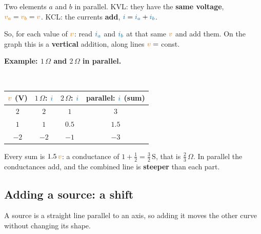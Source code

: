 \documentclass[11pt,a4paper]{article}
\newcommand{\Icol}[1]{\textcolor{ccur}{#1}}
\newcommand{\Vcol}[1]{\textcolor{cvolt}{#1}}
\newcommand{\uni}[1]{\,\mathrm{#1}}
\newcommand{\Sie}{\uni{S}} \newcommand{\Wb}{\uni{Wb}}
\newcommand{\ohm}{\,\Omega}
\newcommand{\minic}[3]{%
  \begin{scope}[shift={(#1-0.55,1.75)}, scale=\miniscale, transform shape]
    \draw (0,#2) node[ocirc] {}; \draw (0,0) node[ocirc] {};
    #3
  \end{scope}}
\newcommand{\mlab}[1]{{\Large #1}}
\newcommand{\miniscale}{0.62}
\newcommand{\mR}[4]{\draw (#1,#2) to[R, l=\mlab{#4}] (#1,#3);}
\newcommand{\mW}[2]{\draw (0,#1) -- (#2,#1); \draw (0,0) -- (#2,0);}                             %
\newcommand{\miniR}[2]{\minic{#1}{2.2}{\mW{2.2}{0.8} \mR{0.8}{2.2}{0}{#2}}}
\newcommand{\miniRpR}[3]{\minic{#1}{2.2}{\mW{2.2}{2.3} \mR{0.8}{2.2}{0}{#2} \mR{2.3}{2.2}{0}{#3}}}
\newcommand{\addRRp}[1]{%
  \path (-0.2,-2.46) rectangle (12.296,3.16);
  \draw[vax] (0,0) -- (2.496,0) node[right=0pt, font=\tiny, text=cvolt] {$v$};
  \draw[vax] (1.248,-1.56) -- (1.248,1.56) node[above=0pt, font=\tiny, text=ccur] {$i$};
  \draw[gray!60] (0.288,-0.05) -- (0.288,0.05); \node[font=\tiny, text=gray, below] at (0.288,-0.03) {$-2$};
  \draw[gray!60] (2.208,-0.05) -- (2.208,0.05); \node[font=\tiny, text=gray, below] at (2.208,-0.03) {$2$};
  \draw[gray!60] (1.198,-1.2) -- (1.298,-1.2); \node[font=\tiny, text=gray, left] at (1.228,-1.2) {$-3$};
  \draw[gray!60] (1.198,1.2) -- (1.298,1.2); \node[font=\tiny, text=gray, left] at (1.228,1.2) {$3$};
  \node[font=\scriptsize, text=metugray] at (1.248,-2.11) {$1\ohm$};
  \begin{scope}[yshift=0.06cm]\miniR{1.298}{$1\ohm$}\end{scope}
  \draw[crv] (0,-1.04) -- (2.496,1.04);
  \ifnum#1>1 \draw[gline] (2.208,-1.56) -- (2.208,1.56); \node[gdot] at (2.208,0.8) {}; \fi
  \ifnum#1>2 \draw[gline] (0.288,-1.56) -- (0.288,1.56); \node[gdot] at (0.288,-0.8) {}; \fi
  \ifnum#1>2 \draw[gline] (1.728,-1.56) -- (1.728,1.56); \node[gdot] at (1.728,0.4) {}; \fi
  \draw[vax] (4.6,0) -- (7.096,0) node[right=0pt, font=\tiny, text=cvolt] {$v$};
  \draw[vax] (5.848,-1.56) -- (5.848,1.56) node[above=0pt, font=\tiny, text=ccur] {$i$};
  \draw[gray!60] (4.888,-0.05) -- (4.888,0.05); \node[font=\tiny, text=gray, below] at (4.888,-0.03) {$-2$};
  \draw[gray!60] (6.808,-0.05) -- (6.808,0.05); \node[font=\tiny, text=gray, below] at (6.808,-0.03) {$2$};
  \draw[gray!60] (5.798,-1.2) -- (5.898,-1.2); \node[font=\tiny, text=gray, left] at (5.828,-1.2) {$-3$};
  \draw[gray!60] (5.798,1.2) -- (5.898,1.2); \node[font=\tiny, text=gray, left] at (5.828,1.2) {$3$};
  \node[font=\scriptsize, text=metugray] at (5.848,-2.11) {$2\ohm$};
  \begin{scope}[yshift=0.06cm]\miniR{5.898}{$2\ohm$}\end{scope}
  \draw[crv] (4.6,-0.52) -- (7.096,0.52);
  \ifnum#1>1 \draw[gline] (6.808,-1.56) -- (6.808,1.56); \node[gdot] at (6.808,0.4) {}; \fi
  \ifnum#1>2 \draw[gline] (4.888,-1.56) -- (4.888,1.56); \node[gdot] at (4.888,-0.4) {}; \fi
  \ifnum#1>2 \draw[gline] (6.328,-1.56) -- (6.328,1.56); \node[gdot] at (6.328,0.2) {}; \fi
  \draw[vax] (9.2,0) -- (11.696,0) node[right=0pt, font=\tiny, text=cvolt] {$v$};
  \draw[vax] (10.448,-1.56) -- (10.448,1.56) node[above=0pt, font=\tiny, text=ccur] {$i$};
  \draw[gray!60] (9.488,-0.05) -- (9.488,0.05); \node[font=\tiny, text=gray, below] at (9.488,-0.03) {$-2$};
  \draw[gray!60] (11.408,-0.05) -- (11.408,0.05); \node[font=\tiny, text=gray, below] at (11.408,-0.03) {$2$};
  \draw[gray!60] (10.398,-1.2) -- (10.498,-1.2); \node[font=\tiny, text=gray, left] at (10.428,-1.2) {$-3$};
  \draw[gray!60] (10.398,1.2) -- (10.498,1.2); \node[font=\tiny, text=gray, left] at (10.428,1.2) {$3$};
  \node[font=\scriptsize, text=metugray] at (10.448,-2.11) {parallel: $\frac23\ohm$};
  \begin{scope}[yshift=0.06cm]\miniRpR{10.498}{$1\ohm$}{$2\ohm$}\end{scope}
  \ifnum#1>3 \draw[crv] (9.2,-1.56) -- (11.696,1.56); \fi
  \ifnum#1>1 \draw[gline] (11.408,-1.56) -- (11.408,1.56); \node[gdot] at (11.408,1.2) {}; \fi
  \ifnum#1>2 \draw[gline] (9.488,-1.56) -- (9.488,1.56); \node[gdot] at (9.488,-1.2) {}; \fi
  \ifnum#1>2 \draw[gline] (10.928,-1.56) -- (10.928,1.56); \node[gdot] at (10.928,0.6) {}; \fi
  \node[font=\large] at (3.668,0.702) {\shortstack{$+$\\[1pt]{\tiny add $i$}}};
  \node[font=\large] at (8.268,0.702) {$=$};
}
\begin{document}
\begin{minipage}[c]{0.3\linewidth}
\centering
{}
\end{minipage}\hfill
\begin{minipage}[c]{0.66\linewidth}
Two elements $a$ and $b$ in parallel. KVL: they have the \textbf{same voltage},
$\Vcol{v_a} = \Vcol{v_b} = \Vcol{v}$. KCL: the currents \textbf{add},
$\Icol{i} = \Icol{i_a} + \Icol{i_b}$.

So, for each value of $\Vcol{v}$: read $\Icol{i_a}$ and $\Icol{i_b}$ at that same $\Vcol{v}$ and add
them. On the graph this is a \textbf{vertical} addition, along lines $\Vcol{v} = $ const.
\end{minipage}

\medskip
\textbf{Example: $1\ohm$ and $2\ohm$ in parallel.}
\begin{center}
\\[4pt]
\small
\begin{tabular}{@{}cccc@{}}
\toprule
$\Vcol{v}$ (V) & $1\ohm$: $\Icol{i}$ & $2\ohm$: $\Icol{i}$ & parallel: $\Icol{i}$ (sum)\\
\midrule
$2$ & $2$ & $1$ & $3$\\
$1$ & $1$ & $0.5$ & $1.5$\\
$-2$ & $-2$ & $-1$ & $-3$\\
\bottomrule
\end{tabular}
\end{center}
Every sum is $1.5\,\Vcol{v}$: a conductance of $1 + \frac12 = \frac32\Sie$, that is $\frac23\ohm$. In
parallel the conductances add, and the combined line is \textbf{steeper} than each part.

\subsection{Adding a source: a shift}

A source is a straight line parallel to an axis, so adding it moves the other curve without
changing its shape.
\end{document}
